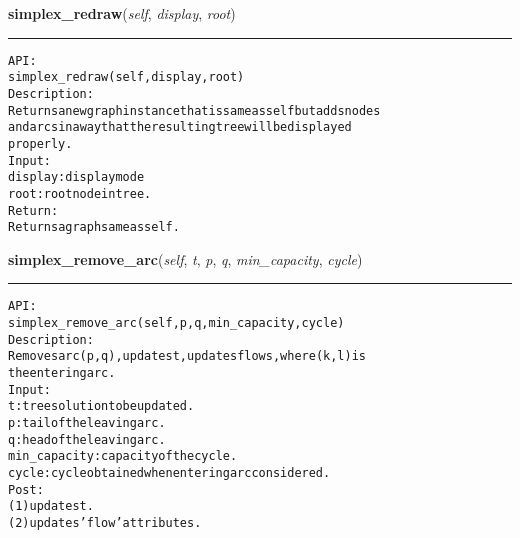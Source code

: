     \label{coinor:gimpy:graph:Graph:simplex_redraw}

    \vspace{0.5ex}

\hspace{.8\funcindent}\begin{boxedminipage}{\funcwidth}

    \raggedright \textbf{simplex\_redraw}(\textit{self}, \textit{display}, \textit{root})

    \vspace{-1.5ex}

    \rule{\textwidth}{0.5\fboxrule}
\setlength{\parskip}{2ex}
\begin{alltt}

API:
    simplex\_redraw(self, display, root)
Description:
    Returns a new graph instance that is same as self but adds nodes
    and arcs in a way that the resulting tree will be displayed
    properly.
Input:
    display: display mode
    root: root node in tree.
Return:
    Returns a graph same as self.
\end{alltt}

\setlength{\parskip}{1ex}
    \end{boxedminipage}

    \label{coinor:gimpy:graph:Graph:simplex_remove_arc}

    \vspace{0.5ex}

\hspace{.8\funcindent}\begin{boxedminipage}{\funcwidth}

    \raggedright \textbf{simplex\_remove\_arc}(\textit{self}, \textit{t}, \textit{p}, \textit{q}, \textit{min\_capacity}, \textit{cycle})

    \vspace{-1.5ex}

    \rule{\textwidth}{0.5\fboxrule}
\setlength{\parskip}{2ex}
\begin{alltt}

API:
    simplex\_remove\_arc(self, p, q, min\_capacity, cycle)
Description:
    Removes arc (p,q), updates t, updates flows, where (k,l) is
    the entering arc.
Input:
    t: tree solution to be updated.
    p: tail of the leaving arc.
    q: head of the leaving arc.
    min\_capacity: capacity of the cycle.
    cycle: cycle obtained when entering arc considered.
Post:
    (1) updates t.
    (2) updates 'flow' attributes.
\end{alltt}

\setlength{\parskip}{1ex}
    \end{boxedminipage}

